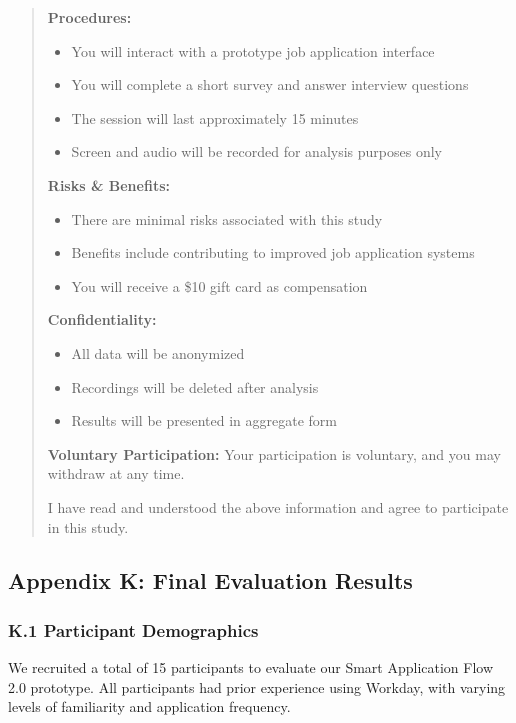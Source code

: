 \documentclass[
	letterpaper, %
]{jdf}
\begin{document}
\begin{sloppypar}
\begin{quote}
\textbf{Procedures:}
\begin{itemize}
    \item You will interact with a prototype job application interface
    \item You will complete a short survey and answer interview questions
    \item The session will last approximately 15 minutes
    \item Screen and audio will be recorded for analysis purposes only
\end{itemize}

\textbf{Risks \& Benefits:}
\begin{itemize}
    \item There are minimal risks associated with this study
    \item Benefits include contributing to improved job application systems
    \item You will receive a \$10 gift card as compensation
\end{itemize}

\textbf{Confidentiality:}
\begin{itemize}
    \item All data will be anonymized
    \item Recordings will be deleted after analysis
    \item Results will be presented in aggregate form
\end{itemize}

\textbf{Voluntary Participation:} Your participation is voluntary, and you may withdraw at any time.

I have read and understood the above information and agree to participate in this study.
\end{quote}

\newpage

\subsection{Appendix K: Final Evaluation Results}
\subsubsection{K.1 Participant Demographics}

We recruited a total of 15 participants to evaluate our Smart Application Flow 2.0 prototype. All participants had prior experience using Workday, with varying levels of familiarity and application frequency.


\end{sloppypar}
\end{document}
